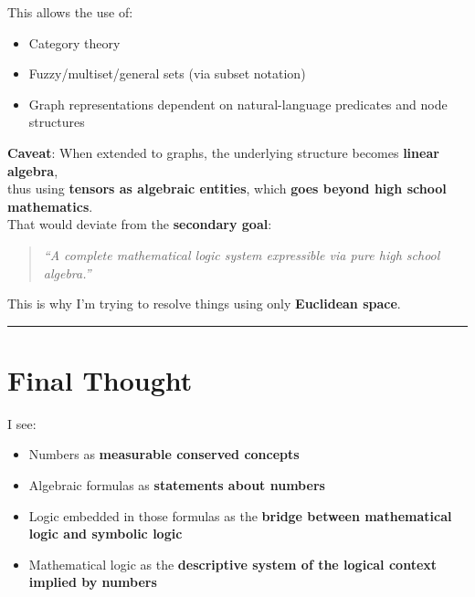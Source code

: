 \documentclass{article}
\begin{document}
This allows the use of:

\begin{itemize}
    \item Category theory
    \item Fuzzy/multiset/general sets (via subset notation)
    \item Graph representations dependent on natural-language predicates and node structures
\end{itemize}

\textbf{Caveat}: When extended to graphs, the underlying structure becomes \textbf{linear algebra},\\
thus using \textbf{tensors as algebraic entities}, which \textbf{goes beyond high school mathematics}.\\

That would deviate from the \textbf{secondary goal}:

\begin{quote}
\textit{``A complete mathematical logic system expressible via pure high school algebra.''}
\end{quote}

This is why I’m trying to resolve things using only \textbf{Euclidean space}.

\bigskip
\hrule
\bigskip

\section*{Final Thought}

I see:

\begin{itemize}
    \item Numbers as \textbf{measurable conserved concepts}
    \item Algebraic formulas as \textbf{statements about numbers}
    \item Logic embedded in those formulas as the \textbf{bridge between mathematical logic and symbolic logic}
    \item Mathematical logic as the \textbf{descriptive system of the logical context implied by numbers}
\end{itemize}
\end{document}
